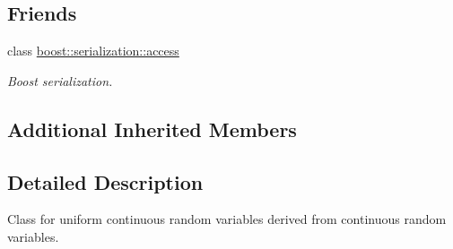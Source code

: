 \subsection*{Friends}
\begin{DoxyCompactItemize}
\item 
class \hyperlink{class_c_uniform_c_r_v_ac98d07dd8f7b70e16ccb9a01abf56b9c}{boost\-::serialization\-::access}
\begin{DoxyCompactList}\small\item\em Boost serialization. \end{DoxyCompactList}\end{DoxyCompactItemize}
\subsection*{Additional Inherited Members}


\subsection{Detailed Description}
Class for uniform continuous random variables derived from continuous random variables. 

